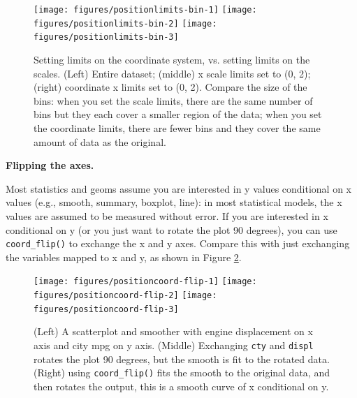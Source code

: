 \begin{figure}

{\centering \texttt{[image: figures/positionlimits-bin-1]} \texttt{[image: figures/positionlimits-bin-2]} \texttt{[image: figures/positionlimits-bin-3]} 

}

\caption{Setting limits on the coordinate system, vs. setting limits on the scales.  (Left) Entire dataset; (middle) x scale limits set to (0, 2); (right) coordinate x limits set to (0, 2).  Compare the size of the bins: when you set the scale limits, there are the same number of bins but they each cover a smaller region of the data; when you set the coordinate limits, there are fewer bins and they cover the same amount of data as the original.\label{fig:limits-bin}}
\end{figure}

\textbf{Flipping the axes.}

Most statistics and geoms assume you are interested in y values
conditional on x values (e.g., smooth, summary, boxplot, line): in most
statistical models, the x values are assumed to be measured without
error. If you are interested in x conditional on y (or you just want to
rotate the plot 90 degrees), you can use \texttt{coord\_flip()} to
exchange the x and y axes. Compare this with just exchanging the
variables mapped to x and y, as shown in Figure \ref{fig:coord-flip}.
 

\begin{Shaded}
\begin{Highlighting}[]
 \StringTok{ }\NormalTok{()}
 \StringTok{ }\NormalTok{()}
 \StringTok{ }\NormalTok{() +}\StringTok{ }\NormalTok{()}
\end{Highlighting}
\end{Shaded}

\begin{figure}

{\centering \texttt{[image: figures/positioncoord-flip-1]} \texttt{[image: figures/positioncoord-flip-2]} \texttt{[image: figures/positioncoord-flip-3]} 

}

\caption{(Left) A scatterplot and smoother with engine displacement on x axis and city mpg on y axis.  (Middle) Exchanging \texttt{cty} and \texttt{displ} rotates the plot 90 degrees, but the smooth is fit to the rotated data.  (Right) using \texttt{coord\_flip()} fits the smooth to the original data, and then rotates the output, this is a smooth curve of x conditional on y.\label{fig:coord-flip}}
\end{figure}

